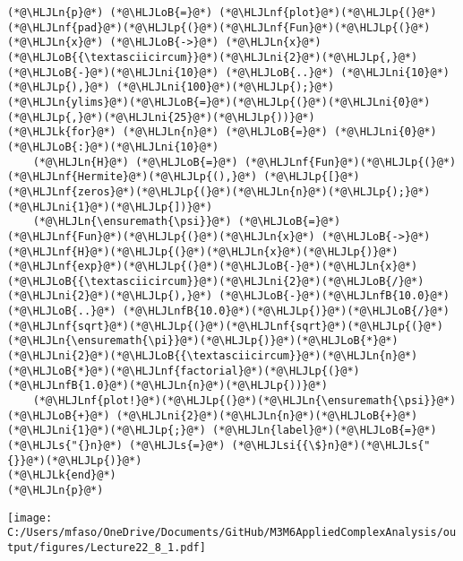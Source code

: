 \documentclass[12pt,landscape]{article}
\newcommand{\HLJLk}[1]{\textcolor[RGB]{148,91,176}{\textbf{#1}}}
\newcommand{\HLJLn}[1]{#1}
\newcommand{\HLJLnf}[1]{\textcolor[RGB]{66,102,213}{#1}}
\newcommand{\HLJLs}[1]{\textcolor[RGB]{201,61,57}{#1}}
\newcommand{\HLJLsi}[1]{#1}
\newcommand{\HLJLnfB}[1]{\textcolor[RGB]{59,151,46}{#1}}
\newcommand{\HLJLni}[1]{\textcolor[RGB]{59,151,46}{#1}}
\newcommand{\HLJLoB}[1]{\textcolor[RGB]{102,102,102}{\textbf{#1}}}
\newcommand{\HLJLp}[1]{#1}
\begin{document}
{\begin{lstlisting}
(*@\HLJLn{p}@*) (*@\HLJLoB{=}@*) (*@\HLJLnf{plot}@*)(*@\HLJLp{(}@*)(*@\HLJLnf{pad}@*)(*@\HLJLp{(}@*)(*@\HLJLnf{Fun}@*)(*@\HLJLp{(}@*)(*@\HLJLn{x}@*) (*@\HLJLoB{->}@*) (*@\HLJLn{x}@*)(*@\HLJLoB{{\textasciicircum}}@*)(*@\HLJLni{2}@*)(*@\HLJLp{,}@*) (*@\HLJLoB{-}@*)(*@\HLJLni{10}@*) (*@\HLJLoB{..}@*) (*@\HLJLni{10}@*)(*@\HLJLp{),}@*) (*@\HLJLni{100}@*)(*@\HLJLp{);}@*) (*@\HLJLn{ylims}@*)(*@\HLJLoB{=}@*)(*@\HLJLp{(}@*)(*@\HLJLni{0}@*)(*@\HLJLp{,}@*)(*@\HLJLni{25}@*)(*@\HLJLp{))}@*)
(*@\HLJLk{for}@*) (*@\HLJLn{n}@*) (*@\HLJLoB{=}@*) (*@\HLJLni{0}@*)(*@\HLJLoB{:}@*)(*@\HLJLni{10}@*)
    (*@\HLJLn{H}@*) (*@\HLJLoB{=}@*) (*@\HLJLnf{Fun}@*)(*@\HLJLp{(}@*)(*@\HLJLnf{Hermite}@*)(*@\HLJLp{(),}@*) (*@\HLJLp{[}@*)(*@\HLJLnf{zeros}@*)(*@\HLJLp{(}@*)(*@\HLJLn{n}@*)(*@\HLJLp{);}@*)(*@\HLJLni{1}@*)(*@\HLJLp{])}@*)
    (*@\HLJLn{\ensuremath{\psi}}@*) (*@\HLJLoB{=}@*) (*@\HLJLnf{Fun}@*)(*@\HLJLp{(}@*)(*@\HLJLn{x}@*) (*@\HLJLoB{->}@*) (*@\HLJLnf{H}@*)(*@\HLJLp{(}@*)(*@\HLJLn{x}@*)(*@\HLJLp{)}@*)(*@\HLJLnf{exp}@*)(*@\HLJLp{(}@*)(*@\HLJLoB{-}@*)(*@\HLJLn{x}@*)(*@\HLJLoB{{\textasciicircum}}@*)(*@\HLJLni{2}@*)(*@\HLJLoB{/}@*)(*@\HLJLni{2}@*)(*@\HLJLp{),}@*) (*@\HLJLoB{-}@*)(*@\HLJLnfB{10.0}@*) (*@\HLJLoB{..}@*) (*@\HLJLnfB{10.0}@*)(*@\HLJLp{)}@*)(*@\HLJLoB{/}@*)(*@\HLJLnf{sqrt}@*)(*@\HLJLp{(}@*)(*@\HLJLnf{sqrt}@*)(*@\HLJLp{(}@*)(*@\HLJLn{\ensuremath{\pi}}@*)(*@\HLJLp{)}@*)(*@\HLJLoB{*}@*)(*@\HLJLni{2}@*)(*@\HLJLoB{{\textasciicircum}}@*)(*@\HLJLn{n}@*)(*@\HLJLoB{*}@*)(*@\HLJLnf{factorial}@*)(*@\HLJLp{(}@*)(*@\HLJLnfB{1.0}@*)(*@\HLJLn{n}@*)(*@\HLJLp{))}@*)
    (*@\HLJLnf{plot!}@*)(*@\HLJLp{(}@*)(*@\HLJLn{\ensuremath{\psi}}@*) (*@\HLJLoB{+}@*) (*@\HLJLni{2}@*)(*@\HLJLn{n}@*)(*@\HLJLoB{+}@*)(*@\HLJLni{1}@*)(*@\HLJLp{;}@*) (*@\HLJLn{label}@*)(*@\HLJLoB{=}@*)(*@\HLJLs{"{}n}@*) (*@\HLJLs{=}@*) (*@\HLJLsi{{\$}n}@*)(*@\HLJLs{"{}}@*)(*@\HLJLp{)}@*)
(*@\HLJLk{end}@*)
(*@\HLJLn{p}@*)
\end{lstlisting}

\texttt{[image: C:/Users/mfaso/OneDrive/Documents/GitHub/M3M6AppliedComplexAnalysis/output/figures/Lecture22\_8\_1.pdf]}

}
\end{document}
